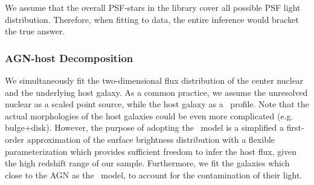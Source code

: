 \documentclass[apj]{emulateapj}
\begin{document}
We assume that the overall PSF-stars in the library cover all possible PSF light distribution. Therefore, when fitting to data, the entire inference would bracket the true answer.

\subsubsection{AGN-host Decomposition}
We simultaneously fit the two-dimensional flux distribution of the center nuclear and the underlying host galaxy. As a common practice, we assume the unresolved nuclear as a scaled point source, while the host galaxy as a \sersic\ profile. Note that the actual morphologies of the host galaxies could be even more complicated (e.g. bulge+disk). However, the purpose of adopting the \sersic\ model is a simplified a first-order approximation of the surface brightness distribution with a flexible parameterization which provides sufficient freedom to infer the host flux, given the high redshift range of our sample. Furthermore, we fit the galaxies which close to the AGN as the \sersic\ model, to account for the contamination of their light.
\end{document}
